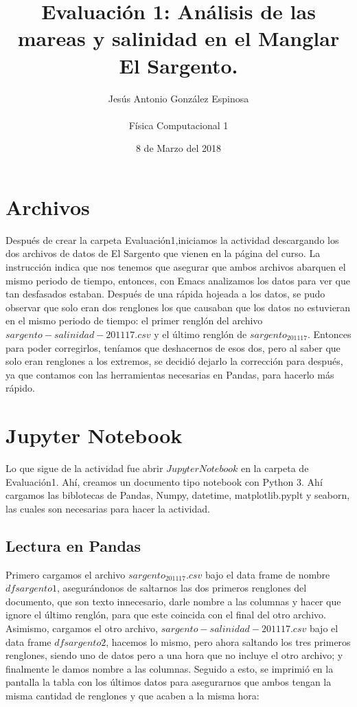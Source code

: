 \documentclass[a4paper]{article}
\title{Evaluación 1: Análisis de las mareas y salinidad en el Manglar El Sargento.}
\author{Jesús Antonio González Espinosa \\ \\ Física Computacional 1}
\date{8 de Marzo del 2018}
\begin{document}
\maketitle

\section{Archivos}
Después de crear la carpeta Evaluación1,iniciamos la actividad descargando los dos archivos  de datos de El Sargento que vienen en la página del curso.
La instrucción indica que nos tenemos que asegurar que ambos archivos abarquen el mismo periodo de tiempo, entonces, con Emacs analizamos los datos para ver que tan desfasados estaban. Después de una rápida hojeada a los datos, se pudo observar que solo eran dos renglones los que causaban que los datos no estuvieran en el mismo periodo de tiempo: el primer renglón del archivo $sargento-salinidad-201117.csv$ y el último renglón de $sargento_201117$. Entonces para poder corregirlos, teníamos que deshacernos de esos dos, pero al saber que solo eran renglones a los extremos, se decidió dejarlo la corrección para después, ya que contamos con las herramientas necesarias en Pandas, para hacerlo más rápido. 


\section{Jupyter Notebook}
Lo que sigue de la actividad fue abrir $Jupyter Notebook$ en la carpeta de Evaluación1. Ahí, creamos un documento tipo notebook con Python 3. Ahí cargamos las biblotecas de Pandas, Numpy, datetime, matplotlib.pyplt y seaborn, las cuales son necesarias para hacer la actividad.  

\subsection{Lectura en Pandas}
Primero cargamos el archivo $sargento_201117.csv$ bajo el data frame de nombre $dfsargento1$, asegurándonos de saltarnos las dos primeros renglones del documento, que son texto innecesario, darle nombre a las columnas y hacer que ignore el último renglón, para que este coincida con el final del otro archivo. Asimismo, cargamos el otro archivo, $sargento-salinidad-201117.csv$ bajo el data frame $dfsargento2$, hacemos lo mismo, pero ahora saltando los tres primeros renglones, siendo uno de datos pero a una hora que no incluye el otro archivo; y finalmente le damos nombre a las columnas. Seguido a esto, se imprimió en la pantalla la tabla con los últimos datos para asegurarnos que ambos tengan la misma cantidad de renglones y que acaben a la misma hora:
\end{document}
